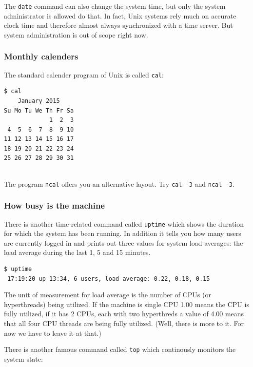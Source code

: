 \documentclass[11pt,a4paper,twoside]{article}
\begin{document}
The \texttt{date} command can also change the system time, but only the
system administrator is allowed do that. In fact, Unix systems rely much
on accurate clock time and therefore almost always synchronized with a 
time server. But system administration is out of scope right now.


\subsubsection{Monthly calenders}

The standard calender program of Unix is called \texttt{cal}:

\begin{lstlisting}[frame=single]
$ cal
    January 2015      
Su Mo Tu We Th Fr Sa  
             1  2  3  
 4  5  6  7  8  9 10  
11 12 13 14 15 16 17  
18 19 20 21 22 23 24  
25 26 27 28 29 30 31  
                      
\end{lstlisting}

The program \texttt{ncal} offers you an alternative layout. Try 
\texttt{cal -3} and \texttt{ncal -3}.

\subsubsection{How busy is the machine}

There is another time-related command called \texttt{uptime} which shows the
duration for which the system has been running. In addition it tells you how
many users are currently logged in and prints out three values for system load 
averages: the load average during the last 1, 5 and 15 minutes.

\begin{lstlisting}[frame=single]
$ uptime
 17:19:20 up 13:34, 6 users, load average: 0.22, 0.18, 0.15
\end{lstlisting}

The unit of measurement for load average is the number of CPUs (or 
hyperthreads) being utilized. If the machine is single CPU 1.00 means 
the CPU is fully utilized, if it has 2 CPUs, each with two hyperthreds a 
value of 4.00 means that all four CPU threads are being fully utilized. 
(Well, there is more to it. For now we have to leave it at that.)

There is another famous command called \texttt{top} which continously 
monitors the system state:
\end{document}
